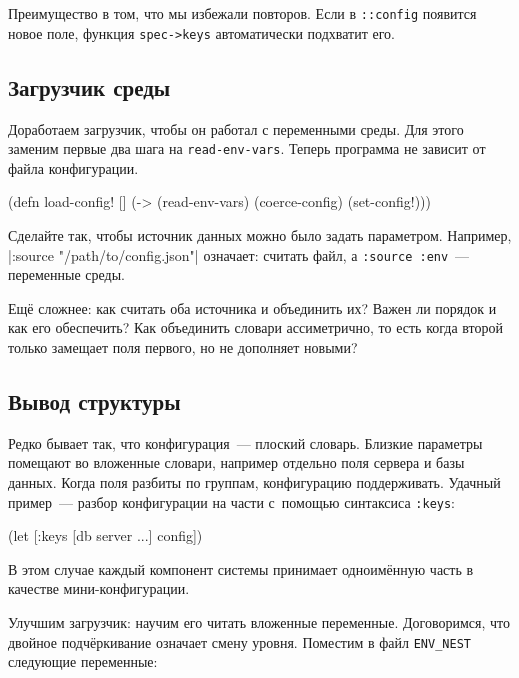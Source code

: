 Преимущество в том, что мы избежали повторов. Если в \verb|::config| появится
новое поле, функция \verb|spec->keys| автоматически подхватит его.

\subsection{Загрузчик среды}

Доработаем загрузчик, чтобы он работал с переменными среды. Для этого заменим
первые два шага на \verb|read-env-vars|. Теперь программа не зависит от файла
конфигурации.

\begin{english}
  \begin{clojure}
(defn load-config! []
  (-> (read-env-vars)
      (coerce-config)
      (set-config!)))
  \end{clojure}
\end{english}

Сделайте так, чтобы источник данных можно было задать параметром. Например,
\spverb|:source "/path/to/config.json"| означает: считать файл, а
\verb|:source :env|~--- переменные среды.


Ещё сложнее: как считать оба источника и объединить их? Важен ли порядок и как
его обеспечить? Как объединить словари ассиметрично, то есть когда второй только
замещает поля первого, но не дополняет новыми?

\subsection{Вывод структуры}


Редко бывает так, что конфигурация~--- плоский словарь. Близкие параметры
помещают во вложенные словари, например отдельно поля сервера и базы
данных. Когда поля разбиты по группам, конфигурацию поддерживать. Удачный
пример~--- разбор конфигурации на части с~помощью синтаксиса \verb|:keys|:

\begin{english}
  \begin{clojure}
(let [{:keys [db server ...]} config])
  \end{clojure}
\end{english}

\noindent
В этом случае каждый компонент системы принимает одноимённую часть в качестве
мини-конфигурации.

Улучшим загрузчик: научим его читать вложенные переменные. Договоримся, что
двойное подчёркивание означает смену уровня. Поместим в файл \verb|ENV_NEST|
следующие переменные:

